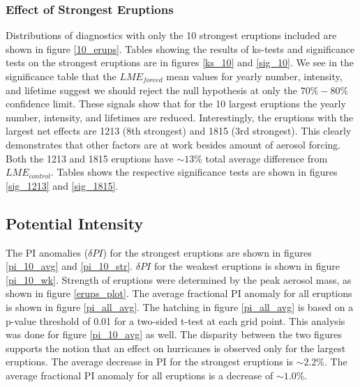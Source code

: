 \documentclass[phd,tocprelim]{cornell}
\begin{document}
\subsubsection{Effect of Strongest Eruptions}
Distributions of diagnostics with only the 10 strongest eruptions
included are shown in figure \ref{10_erups}. Tables showing the
results of ks-tests and significance tests on the strongest eruptions
are in figures \ref{ks_10} and \ref{sig_10}. We see in the
significance table that the $LME_{forced}$ mean values for yearly
number, intensity, and lifetime suggest we should reject the null
hypothesis at only the $70\%-80\%$ confidence limit. These signals
show that for the 10 largest eruptions the yearly number, intensity,
and lifetimes are reduced. Interestingly, the eruptions with the
largest net effects are 1213 (8th strongest) and 1815 (3rd
strongest). This clearly demonstrates that other factors are at work
besides amount of aerosol forcing. Both the 1213 and 1815 eruptions
have ${\sim}13\%$ total average difference from
$LME_{control}$. Tables shows the respective significance tests are
shown in figures \ref{sig_1213} and \ref{sig_1815}.

\subsection{Potential Intensity}
The PI anomalies ($\delta PI$) for the strongest eruptions are shown in figures \ref{pi_10_avg} and \ref{pi_10_str}. $\delta PI$ for the weakest eruptions is shown in figure \ref{pi_10_wk}. Strength of eruptions were determined by the peak aerosol mass, as shown in figure \ref{erups_plot}. The average fractional PI anomaly for all eruptions is shown in figure \ref{pi_all_avg}. The hatching in figure \ref{pi_all_avg} is based on a p-value threshold of 0.01 for a two-sided t-test at each grid point. This analysis was done for figure \ref{pi_10_avg} as well. The disparity between the two figures supports the notion that an effect on hurricanes is observed only for the largest eruptions. The average decrease in PI for the strongest eruptions is ${\sim}2.2\%$. The average fractional PI anomaly for all eruptions is a decrease of ${\sim}1.0\%$.   
\end{document}
